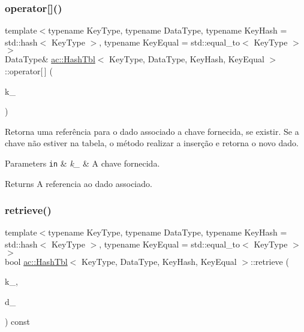 \subsubsection{\texorpdfstring{operator[]()}{operator[]()}}
{\footnotesize\ttfamily template$<$typename Key\+Type, typename Data\+Type, typename Key\+Hash = std\+::hash$<$ Key\+Type $>$, typename Key\+Equal = std\+::equal\+\_\+to$<$ Key\+Type $>$$>$ \\
Data\+Type\& \hyperlink{classac_1_1HashTbl}{ac\+::\+Hash\+Tbl}$<$ Key\+Type, Data\+Type, Key\+Hash, Key\+Equal $>$\+::operator\mbox{[}$\,$\mbox{]} (\begin{DoxyParamCaption}\item[{const Key\+Type \&}]{k\+\_\+ }\end{DoxyParamCaption})\hspace{0.3cm}{\ttfamily [inline]}}



Retorna uma referência para o dado associado a chave fornecida, se existir. Se a chave não estiver na tabela, o método realizar a inserção e retorna o novo dado. 


\begin{DoxyParams}[1]{Parameters}
\mbox{\tt in}  & {\em k\+\_\+} & A chave fornecida.\\
\hline
\end{DoxyParams}
\begin{DoxyReturn}{Returns}
A referencia ao dado associado. 
\end{DoxyReturn}
\mbox{\label{classac_1_1HashTbl_afd9798982409ae5a1955259190fd175e}} 
\subsubsection{\texorpdfstring{retrieve()}{retrieve()}}
{\footnotesize\ttfamily template$<$typename Key\+Type, typename Data\+Type, typename Key\+Hash = std\+::hash$<$ Key\+Type $>$, typename Key\+Equal = std\+::equal\+\_\+to$<$ Key\+Type $>$$>$ \\
bool \hyperlink{classac_1_1HashTbl}{ac\+::\+Hash\+Tbl}$<$ Key\+Type, Data\+Type, Key\+Hash, Key\+Equal $>$\+::retrieve (\begin{DoxyParamCaption}\item[{const Key\+Type \&}]{k\+\_\+,  }\item[{Data\+Type \&}]{d\+\_\+ }\end{DoxyParamCaption}) const\hspace{0.3cm}{\ttfamily [inline]}}



